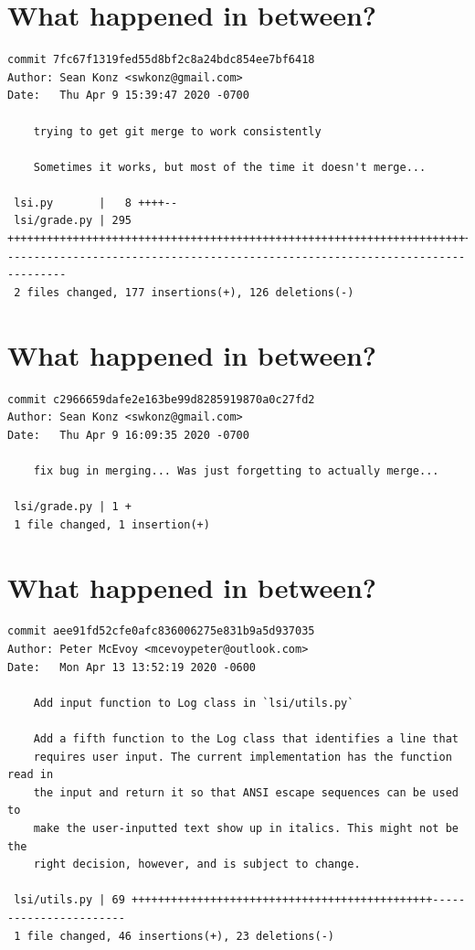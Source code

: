 \documentclass{article}
\begin{document}
\section*{What happened in between?}
\vspace{2ex}
\begin{verbatim}
commit 7fc67f1319fed55d8bf2c8a24bdc854ee7bf6418
Author: Sean Konz <swkonz@gmail.com>
Date:   Thu Apr 9 15:39:47 2020 -0700

    trying to get git merge to work consistently

    Sometimes it works, but most of the time it doesn't merge...

 lsi.py       |   8 ++++--
 lsi/grade.py | 295 +++++++++++++++++++++++++++++++++++++++++++++++++++++++++++++++++++++++++++++++++++++++++++++++++++++++++++++++--------------------------------------------------------------------------------
 2 files changed, 177 insertions(+), 126 deletions(-)

\end{verbatim}

\newpage

\section*{What happened in between?}
\vspace{2ex}
\begin{verbatim}
commit c2966659dafe2e163be99d8285919870a0c27fd2
Author: Sean Konz <swkonz@gmail.com>
Date:   Thu Apr 9 16:09:35 2020 -0700

    fix bug in merging... Was just forgetting to actually merge...

 lsi/grade.py | 1 +
 1 file changed, 1 insertion(+)

\end{verbatim}

\newpage

\section*{What happened in between?}
\vspace{2ex}
\begin{verbatim}
commit aee91fd52cfe0afc836006275e831b9a5d937035
Author: Peter McEvoy <mcevoypeter@outlook.com>
Date:   Mon Apr 13 13:52:19 2020 -0600

    Add input function to Log class in `lsi/utils.py`
    
    Add a fifth function to the Log class that identifies a line that
    requires user input. The current implementation has the function read in
    the input and return it so that ANSI escape sequences can be used to
    make the user-inputted text show up in italics. This might not be the
    right decision, however, and is subject to change.

 lsi/utils.py | 69 ++++++++++++++++++++++++++++++++++++++++++++++-----------------------
 1 file changed, 46 insertions(+), 23 deletions(-)

\end{verbatim}
\end{document}
